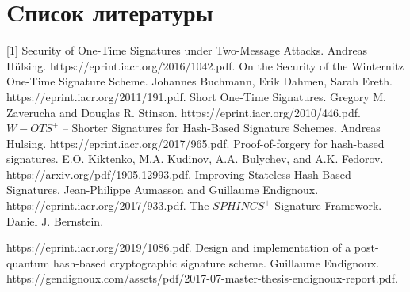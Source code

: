 \documentclass[a4paper, 14pt]{extarticle}
\begin{document}
\section{Cписок литературы}
[1] Security of One-Time Signatures under Two-Message Attacks. Andreas Hülsing. https://eprint.iacr.org/2016/1042.pdf.
\newline
\newline
[2] On the Security of the Winternitz One-Time Signature Scheme. Johannes Buchmann, Erik Dahmen, Sarah Ereth. https://eprint.iacr.org/2011/191.pdf.
\newline
\newline
[3] Short One-Time Signatures. Gregory M. Zaverucha and Douglas R. Stinson. https://eprint.iacr.org/2010/446.pdf.
\newline
\newline
[4] $W-OTS^{+}$ – Shorter Signatures for Hash-Based Signature Schemes. Andreas Hulsing. https://eprint.iacr.org/2017/965.pdf.
\newline
\newline
[5] Proof-of-forgery for hash-based signatures. E.O. Kiktenko, M.A. Kudinov, A.A. Bulychev, and A.K. Fedorov. https://arxiv.org/pdf/1905.12993.pdf.
\newline
\newline
[6] Improving Stateless Hash-Based Signatures. Jean-Philippe Aumasson and Guillaume Endignoux. https://eprint.iacr.org/2017/933.pdf.
\newline
\newline
[7] The $SPHINCS^{+}$ Signature Framework. Daniel J. Bernstein.

https://eprint.iacr.org/2019/1086.pdf.
\newline
\newline
[8] Design and implementation of a post-quantum
hash-based cryptographic signature scheme. Guillaume Endignoux. https://gendignoux.com/assets/pdf/2017-07-master-thesis-endignoux-report.pdf.
\newpage

\end{document}

